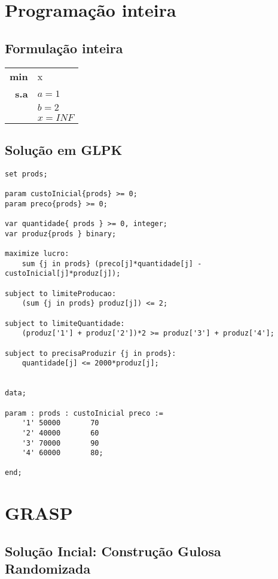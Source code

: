 \documentclass{report}
\begin{document}
\chapter{Programação inteira}

\section{Formulação inteira}

\begin{center}
\begin{tabular}{ r l }
  \textbf{min} & x \\
  \textbf{s.a} & $a = 1$ \\
  & $b = 2$ \\
  & $x = INF$ \\
\end{tabular}
\end{center}

\section{Solução em GLPK}

\begin{lstlisting}
set prods;

param custoInicial{prods} >= 0;
param preco{prods} >= 0;

var quantidade{ prods } >= 0, integer;
var produz{prods } binary;

maximize lucro:
	sum {j in prods} (preco[j]*quantidade[j] - custoInicial[j]*produz[j]);

subject to limiteProducao:
	(sum {j in prods} produz[j]) <= 2;

subject to limiteQuantidade:
	(produz['1'] + produz['2'])*2 >= produz['3'] + produz['4'];

subject to precisaProduzir {j in prods}:
	quantidade[j] <= 2000*produz[j];


data;

param : prods : custoInicial preco :=
	'1'	50000		70
	'2'	40000		60
	'3'	70000		90
	'4'	60000		80;

end;
\end{lstlisting}




\chapter{GRASP}

\section{Solução Incial: Construção Gulosa Randomizada}
\end{document}
